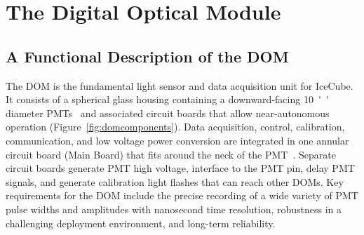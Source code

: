 
\newcommand{\degC}[1]{$\unit[#1]{^\circ{C}}$}
\def\lsim{\mathrel{\rlap{\raise 0.2ex\hbox{$\,<\,$}}{\lower 0.9ex\hbox{$\,\sim\,$}}}}
\def\gsim{\mathrel{\rlap{\raise 0.2ex\hbox{$\,>\,$}}{\lower 0.9ex\hbox{$\,\sim\,$}}}}


\section{\label{sec:dom}The Digital Optical Module}

\subsection{\label{sec:dom_functional}A Functional Description of the DOM}

The DOM is the fundamental light sensor and data acquisition unit for IceCube.
It consists of a spherical glass housing 
containing a downward-facing \SI{10}{''} diameter PMTs~\cite{ICECUBE:PMT}
and associated circuit boards that allow near-autonomous operation (Figure~\ref{fig:domcomponents}).
Data acquisition, control, calibration, communication, and low voltage power conversion 
are integrated in one annular circuit board (Main Board) that fits around the neck of the PMT~\cite{ICECUBE:DAQ}. 
Separate circuit boards generate PMT high voltage, interface to the PMT pin,
delay PMT signals, and generate calibration light flashes that can reach other DOMs.
Key requirements for the DOM include
the precise recording of a wide variety of PMT pulse widths and amplitudes with nanosecond time resolution, robustness in
a challenging deployment environment, and long-term reliability.

